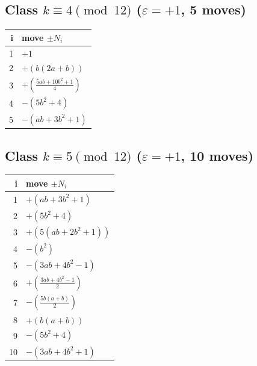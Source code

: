 \subsection*{Class $k\equiv 4\pmod{12}$ \quad ($\varepsilon=+1$, 5 moves)}
\begin{center}\renewcommand{\arraystretch}{1.35}\begin{tabular}{@{}r@{\quad}l@{}}\toprule
i & move $\pm N_i$ \\\midrule
1 & $+1$ \\
2 & $+(b \left(2 a + b\right))$ \\
3 & $+(\frac{5 a b + 10 b^{2} + 1}{4})$ \\
4 & $-(5 b^{2} + 4)$ \\
5 & $-(a b + 3 b^{2} + 1)$ \\
\bottomrule\end{tabular}\end{center}

\subsection*{Class $k\equiv 5\pmod{12}$ \quad ($\varepsilon=+1$, 10 moves)}
\begin{center}\renewcommand{\arraystretch}{1.35}\begin{tabular}{@{}r@{\quad}l@{}}\toprule
i & move $\pm N_i$ \\\midrule
1 & $+(a b + 3 b^{2} + 1)$ \\
2 & $+(5 b^{2} + 4)$ \\
3 & $+(5 \left(a b + 2 b^{2} + 1\right))$ \\
4 & $-(b^{2})$ \\
5 & $-(3 a b + 4 b^{2} - 1)$ \\
6 & $+(\frac{3 a b + 4 b^{2} - 1}{2})$ \\
7 & $-(\frac{5 b \left(a + b\right)}{2})$ \\
8 & $+(b \left(a + b\right))$ \\
9 & $-(5 b^{2} + 4)$ \\
10 & $-(3 a b + 4 b^{2} + 1)$ \\
\bottomrule\end{tabular}\end{center}


